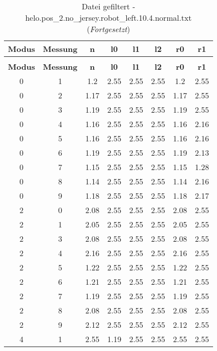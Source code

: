\begin{longtable}{|c|c||c||c|c|c||c|c|}
	\caption{Datei gefiltert - helo.pos\_2.no\_jersey.robot\_left.10.4.normal.txt} \label{tab:helo.pos-2.no-jersey.robot-left.10.4.normal.txt} \\ \hline
	\textbf{Modus} & \textbf{Messung} & \textbf{n} & \textbf{l0} & \textbf{l1} & \textbf{l2} & \textbf{r0} & \textbf{r1}\\ \hline
	\endfirsthead
	\caption[]{Datei gefiltert - helo.pos\_2.no\_jersey.robot\_left.10.4.normal.txt (\emph{Fortgesetzt})} \\ \hline
	\textbf{Modus} & \textbf{Messung} & \textbf{n} & \textbf{l0} & \textbf{l1} & \textbf{l2} & \textbf{r0} & \textbf{r1}\\ \hline
	\endhead
	0 & 1 & 1.2 & 2.55 & 2.55 & 2.55 & 1.2 & 2.55 \\ \hline
	0 & 2 & 1.17 & 2.55 & 2.55 & 2.55 & 1.17 & 2.55 \\ \hline
	0 & 3 & 1.19 & 2.55 & 2.55 & 2.55 & 1.19 & 2.55 \\ \hline
	0 & 4 & 1.16 & 2.55 & 2.55 & 2.55 & 1.16 & 2.16 \\ \hline
	0 & 5 & 1.16 & 2.55 & 2.55 & 2.55 & 1.16 & 2.16 \\ \hline
	0 & 6 & 1.19 & 2.55 & 2.55 & 2.55 & 1.19 & 2.13 \\ \hline
	0 & 7 & 1.15 & 2.55 & 2.55 & 2.55 & 1.15 & 1.28 \\ \hline
	0 & 8 & 1.14 & 2.55 & 2.55 & 2.55 & 1.14 & 2.16 \\ \hline
	0 & 9 & 1.18 & 2.55 & 2.55 & 2.55 & 1.18 & 2.17 \\ \hline
	2 & 0 & 2.08 & 2.55 & 2.55 & 2.55 & 2.08 & 2.55 \\ \hline
	2 & 1 & 2.05 & 2.55 & 2.55 & 2.55 & 2.05 & 2.55 \\ \hline
	2 & 3 & 2.08 & 2.55 & 2.55 & 2.55 & 2.08 & 2.55 \\ \hline
	2 & 4 & 2.16 & 2.55 & 2.55 & 2.55 & 2.16 & 2.55 \\ \hline
	2 & 5 & 1.22 & 2.55 & 2.55 & 2.55 & 1.22 & 2.55 \\ \hline
	2 & 6 & 1.21 & 2.55 & 2.55 & 2.55 & 1.21 & 2.55 \\ \hline
	2 & 7 & 1.19 & 2.55 & 2.55 & 2.55 & 1.19 & 2.55 \\ \hline
	2 & 8 & 2.08 & 2.55 & 2.55 & 2.55 & 2.08 & 2.55 \\ \hline
	2 & 9 & 2.12 & 2.55 & 2.55 & 2.55 & 2.12 & 2.55 \\ \hline
	4 & 1 & 2.55 & 1.19 & 2.55 & 2.55 & 2.55 & 2.55 \\ \hline

\end{longtable}
